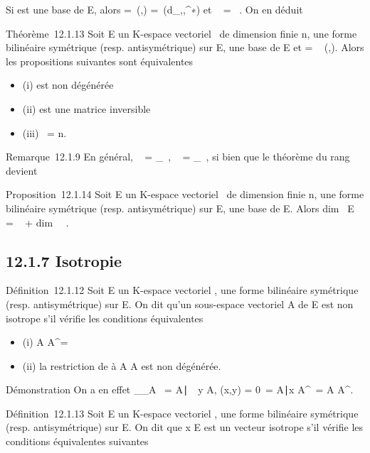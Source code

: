 \documentclass[]{article}
\begin{document}
Si  est une base de E, alors \Omega =\
\mathrmMat (\phi,) =\
\mathrmMat (d_\phi,,^∗) et
\mathrmrg~\phi
= \mathrmrg~\Omega. On en déduit

Théorème~12.1.13 Soit E un K-espace vectoriel ~de dimension finie n, \phi
une forme bilinéaire symétrique (resp. antisymétrique) sur E,  une base
de E et \Omega = \mathrmMat~
(\phi,\mathcal{E}). Alors les propositions suivantes sont équivalentes

\begin{itemize}
\itemsep1pt\parskip0pt
\item
  (i) \phi est non dégénérée
\item
  (ii) \Omega est une matrice inversible
\item
  (iii) \mathrmrg~\phi = n.
\end{itemize}

Remarque~12.1.9 En général,
\mathrmKer~\phi
= \mathrmKerd_\phi~,
\mathrmrg~\phi
= \mathrmrgd_\phi~, si
bien que le théorème du rang devient

Proposition~12.1.14 Soit E un K-espace vectoriel ~de dimension finie n,
\phi une forme bilinéaire symétrique (resp. antisymétrique) sur E,  une
base de E. Alors dim~ E
= \mathrmrg~\phi
+ dim~
\mathrmKer~\phi.

\subsection{12.1.7 Isotropie}

Définition~12.1.12 Soit E un K-espace vectoriel , \phi une forme bilinéaire
symétrique (resp. antisymétrique) sur E. On dit qu'un sous-espace
vectoriel A de E est non isotrope s'il vérifie les conditions
équivalentes

\begin{itemize}
\itemsep1pt\parskip0pt
\item
  (i) A \bigcap A^\bot = \0\
\item
  (ii) la restriction de \phi à A \times A est non dégénérée.
\end{itemize}

Démonstration On a en effet
\mathrmKer\phi__A\timesA~
= \x \in
A∣\forall~~y \in A, \phi(x,y) =
0\ = \x \in
A∣x \in A^\bot\ = A \bigcap
A^\bot.

Définition~12.1.13 Soit E un K-espace vectoriel , \phi une forme bilinéaire
symétrique (resp. antisymétrique) sur E. On dit que x \in E est un vecteur
isotrope s'il vérifie les conditions équivalentes suivantes
\end{document}
